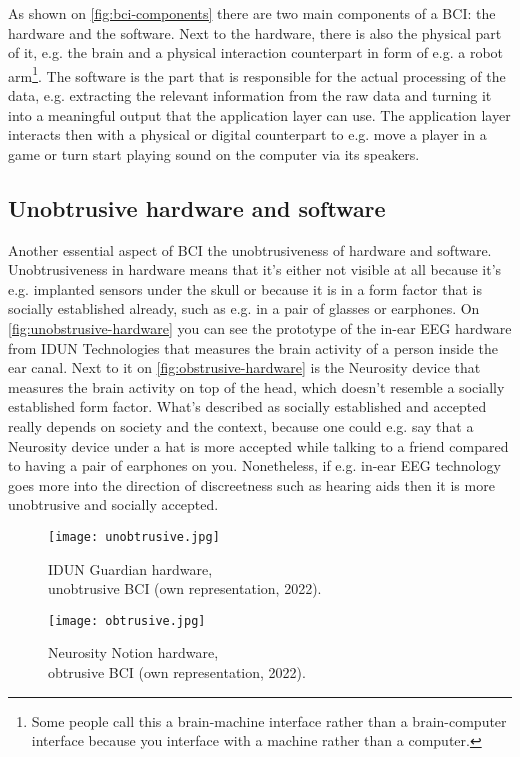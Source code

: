 As shown on \autoref{fig:bci-components} there are two main components of a BCI: the hardware and the software. Next to the hardware, there is also the physical part of it, e.g. the brain and a physical interaction counterpart in form of e.g. a robot arm\footnote{Some people call this a brain-machine interface rather than a brain-computer interface because you interface with a machine rather than a computer.}. The software is the part that is responsible for the actual processing of the data, e.g. extracting the relevant information from the raw data and turning it into a meaningful output that the application layer can use. The application layer interacts then with a physical or digital counterpart to e.g. move a player in a game or turn start playing sound on the computer via its speakers.

\subsection{Unobtrusive hardware and software}
\label{chapter2-unobtrusive-hardware-and-software}

Another essential aspect of BCI the unobtrusiveness of hardware and software. Unobtrusiveness in hardware means that it's either not visible at all because it's e.g. implanted sensors under the skull or because it is in a form factor that is socially established already, such as e.g. in a pair of glasses or earphones. On \autoref{fig:unobstrusive-hardware} you can see the prototype of the in-ear EEG hardware from IDUN Technologies that measures the brain activity of a person inside the ear canal. Next to it on \autoref{fig:obstrusive-hardware} is the Neurosity device that measures the brain activity on top of the head, which doesn't resemble a socially established form factor. What's described as socially established and accepted really depends on society and the context, because one could e.g. say that a Neurosity device under a hat is more accepted while talking to a friend compared to having a pair of earphones on you. Nonetheless, if e.g. in-ear EEG technology goes more into the direction of discreetness such as hearing aids then it is more unobtrusive and socially accepted.

\begin{figure}[!htb]
  \texttt{[image: unobtrusive.jpg]}
  \caption{IDUN Guardian hardware, \\ unobtrusive BCI (own representation, 2022).}
  \label{fig:unobstrusive-hardware}
  \endminipage\hfill
  \texttt{[image: obtrusive.jpg]}
  \caption{Neurosity Notion hardware, \\ obtrusive BCI (own representation, 2022).}
  \label{fig:obstrusive-hardware}
  \endminipage\hfill
\end{figure}

